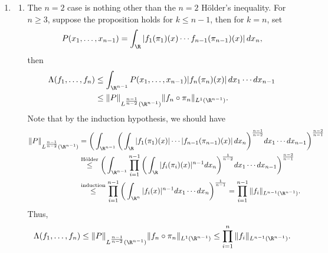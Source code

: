 \begin{enumerate}
\item[1.1.17.]
   \begin{enumerate}
   \item[(a)] The $n=2$ case is nothing other than the $n=2$ Hölder's inequality. 
   For $n \geq 3$, suppose the proposition holds for $k \leq n-1$, 
   then for $k=n$, set \[P(x_{1},\ldots,x_{n-1})
   =\int_{\R}|f_{1}(\pi_{1})(x)\cdots f_{n-1}(\pi_{n-1})(x)|\,dx_{n},\]
   then
   \begin{equation*}\begin{aligned}
   \Lambda(f_{1},\ldots,f_{n}) 
   &\leq \int_{\R^{n-1}}P(x_{1},\ldots,x_{n-1})|f_{n}(\pi_{n})(x)|\,dx_{1}\cdots dx_{n-1} \\
   &\leq \norm{P}_{L^{\frac{n-1}{n-2}}(\R^{n-1})}\norm{f_{n} \circ \pi_{n}}_{L^{1}(\R^{n-1})}.
   \end{aligned}\end{equation*}
   Note that by the induction hypothesis, we should have
   \begin{equation*}\begin{aligned}
   \norm{P}_{L^{\frac{n-1}{n-2}}(\R^{n-1})} 
   &= \bigg(\int_{\R^{n-1}}\bigg(\int_{\R}|f_{1}(\pi_{1})(x)|\cdots|f_{n-1}(\pi_{n-1})(x)|\,dx_{n}\bigg)^{\frac{n-1}{n-2}}dx_{1}\cdots dx_{n-1}\bigg)^{\frac{n-2}{n-1}}
   \\&\overset{\text{Hölder}}{\leq} \bigg(\int_{\R^{n-1}}\prod_{i=1}^{n-1}
   \bigg(\int_{\R}|f_{i}(\pi_{i})(x)|^{n-1}dx_{n}\bigg)^{\frac{1}{n-2}}dx_{1}\cdots dx_{n-1}\bigg)^{\frac{n-2}{n-1}}
   \\&\overset{\text{induction}}{\leq} \prod_{i=1}^{n-1}
   \bigg(\int_{\R^{n}}|f_{i}(x)|^{n-1}dx_{1}\cdots dx_{n}\bigg)^{\frac{1}{n-1}} 
   = \prod_{i=1}^{n-1}\norm{f_{i}}_{L^{n-1}(\R^{n-1})}.
   \end{aligned}\end{equation*}
   Thus, 
   \begin{equation*}\begin{aligned}
   \Lambda(f_{1},\ldots,f_{n}) 
   \leq \norm{P}_{L^{\frac{n-1}{n-2}}(\R^{n-1})}\norm{f_{n} \circ \pi_{n}}_{L^{1}(\R^{n-1})} 
   \leq \prod_{i=1}^{n}\norm{f_{i}}_{L^{n-1}(\R^{n-1})}.
   \end{aligned}\end{equation*}


\end{enumerate}
\end{enumerate}
